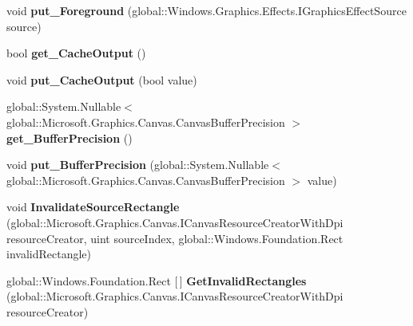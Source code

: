 \begin{DoxyCompactItemize}
void {\bfseries put\+\_\+\+Foreground} (global\+::\+Windows.\+Graphics.\+Effects.\+I\+Graphics\+Effect\+Source source)
\item 
\mbox{\label{class_microsoft_1_1_graphics_1_1_canvas_1_1_effects_1_1_blend_effect_a5277510deb8dcc175e62db9fab054126}} 
bool {\bfseries get\+\_\+\+Cache\+Output} ()
\item 
\mbox{\label{class_microsoft_1_1_graphics_1_1_canvas_1_1_effects_1_1_blend_effect_abf6fc226936245b186bd77eb7281c6ed}} 
void {\bfseries put\+\_\+\+Cache\+Output} (bool value)
\item 
\mbox{\label{class_microsoft_1_1_graphics_1_1_canvas_1_1_effects_1_1_blend_effect_a77470fdd2f3361cf0ef9ed3c79ffb8b8}} 
global\+::\+System.\+Nullable$<$ global\+::\+Microsoft.\+Graphics.\+Canvas.\+Canvas\+Buffer\+Precision $>$ {\bfseries get\+\_\+\+Buffer\+Precision} ()
\item 
\mbox{\label{class_microsoft_1_1_graphics_1_1_canvas_1_1_effects_1_1_blend_effect_a3eeb0529f739eebd077cbf5b93e8ebd0}} 
void {\bfseries put\+\_\+\+Buffer\+Precision} (global\+::\+System.\+Nullable$<$ global\+::\+Microsoft.\+Graphics.\+Canvas.\+Canvas\+Buffer\+Precision $>$ value)
\item 
\mbox{\label{class_microsoft_1_1_graphics_1_1_canvas_1_1_effects_1_1_blend_effect_a5ab40e1ce6749b638dc61d204220d00f}} 
void {\bfseries Invalidate\+Source\+Rectangle} (global\+::\+Microsoft.\+Graphics.\+Canvas.\+I\+Canvas\+Resource\+Creator\+With\+Dpi resource\+Creator, uint source\+Index, global\+::\+Windows.\+Foundation.\+Rect invalid\+Rectangle)
\item 
\mbox{\label{class_microsoft_1_1_graphics_1_1_canvas_1_1_effects_1_1_blend_effect_acb5855f7cd77a875e33463588d6b4eb5}} 
global\+::\+Windows.\+Foundation.\+Rect \mbox{[}$\,$\mbox{]} {\bfseries Get\+Invalid\+Rectangles} (global\+::\+Microsoft.\+Graphics.\+Canvas.\+I\+Canvas\+Resource\+Creator\+With\+Dpi resource\+Creator)

\end{DoxyCompactItemize}
